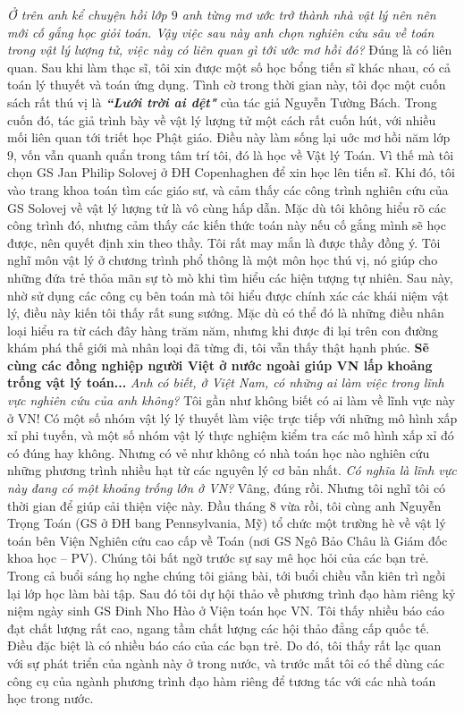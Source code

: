 \begin{multicols}{2}
	\vskip 0.1cm
	\textit{Ở trên anh kể chuyện hồi lớp $9$ anh từng mơ ước trở thành nhà vật lý nên nên mới cố gắng học giỏi toán. Vậy việc sau này anh chọn nghiên cứu sâu về toán trong vật lý lượng tử, việc này có liên quan gì tới ước mơ hồi đó?}
	\vskip 0.1cm 
	Đúng là có liên quan. Sau khi làm thạc sĩ, tôi xin được một số học bổng tiến sĩ khác nhau, có cả toán lý thuyết và toán ứng dụng. Tình cờ trong thời gian này, tôi đọc một cuốn sách rất thú vị là \textbf{\color{diendantoanhoc}\textit{``Lưới trời ai dệt"}} của tác giả Nguyễn Tường Bách. Trong cuốn đó, tác giả trình bày về vật lý lượng tử một cách rất cuốn hút, với nhiều mối liên quan tới triết học Phật giáo. Điều này làm sống lại uớc mơ hồi năm lớp $9$, vốn vẫn quanh quẩn trong tâm trí tôi, đó là học về Vật lý Toán.  
	\vskip 0.1cm
	Vì thế mà tôi chọn GS Jan Philip Solovej ở ĐH Copenhaghen để xin học lên tiến sĩ. Khi đó, tôi vào trang khoa toán tìm các giáo sư, và cảm thấy các công trình nghiên cứu của GS Solovej về vật lý lượng tử là vô cùng hấp dẫn. Mặc dù tôi không hiểu rõ các công trình đó, nhưng cảm thấy các kiến thức toán này nếu cố gắng mình sẽ học được, nên quyết định xin theo thầy. Tôi rất may mắn là được thầy đồng ý. 
	\vskip 0.1cm
	Tôi nghĩ môn vật lý ở chương trình phổ thông là một môn học thú vị, nó giúp cho những đứa trẻ thỏa mãn sự tò mò khi tìm hiểu các hiện tượng tự nhiên. Sau này, nhờ sử dụng các công cụ bên toán mà tôi hiểu được chính xác các khái niệm vật lý, điều này kiến tôi thấy rất sung sướng. Mặc dù có thể đó là những điều nhân loại hiểu ra từ cách đây hàng trăm năm, nhưng khi được đi lại trên con đường khám phá thế giới mà nhân loại đã từng đi, tôi vẫn thấy thật hạnh phúc. 
	\vskip 0.1cm
	\textbf{\color{diendantoanhoc}Sẽ cùng các đồng nghiệp người Việt ở nước ngoài giúp VN lấp khoảng trống vật lý toán...}
	\vskip 0.1cm
	\textit{Anh có biết, ở Việt Nam, có những ai làm việc trong lĩnh vực nghiên cứu của anh không?}
	\vskip 0.1cm 
	Tôi gần như không biết có ai làm về lĩnh vực này ở VN! Có một số nhóm vật lý lý thuyết làm việc trực tiếp với những mô hình xấp xỉ phi tuyến, và một số nhóm vật lý thực nghiệm kiểm tra các mô hình xấp xỉ đó có đúng hay không. Nhưng có vẻ như không có nhà toán học nào nghiên cứu những phương trình nhiều hạt từ các nguyên lý cơ \linebreak bản nhất.  
	\vskip 0.1cm
	\textit{Có nghĩa là lĩnh vực này đang có một khoảng trống lớn ở VN?}
	\vskip 0.1cm 
	Vâng, đúng rồi. Nhưng tôi nghĩ tôi có thời gian để giúp cải thiện việc này. 
	\vskip 0.1cm
	Đầu tháng $8$ vừa rồi, tôi cùng anh Nguyễn Trọng Toán (GS ở ĐH bang Pennsylvania, Mỹ) tổ chức một trường hè về vật lý toán bên Viện Nghiên cứu cao cấp về Toán (nơi GS Ngô Bảo Châu là Giám đốc khoa học -- PV). Chúng tôi bất ngờ trước sự say mê học hỏi của các bạn trẻ. Trong cả buổi sáng họ nghe chúng tôi giảng bài, tới buổi chiều vẫn kiên trì ngồi lại lớp học làm bài tập. Sau đó tôi dự hội thảo về phương trình đạo hàm riêng kỷ niệm ngày sinh GS Đinh Nho Hào ở Viện toán học VN. Tôi thấy nhiều báo cáo đạt chất lượng rất cao, ngang tầm chất lượng các hội thảo đẳng cấp quốc tế. Điều đặc biệt là có nhiều báo cáo của các bạn trẻ. Do đó, tôi thấy rất lạc quan với sự phát triển của ngành này ở trong nước, và trước mắt tôi có thể dùng các công cụ của ngành phương trình đạo hàm riêng để tương tác với các nhà toán học trong nước. 

\end{multicols}
